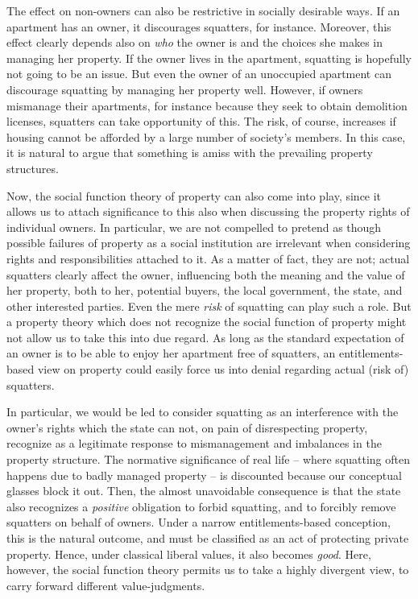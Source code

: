 The effect on non-owners can also be restrictive in socially desirable ways. If an apartment has an owner, it discourages squatters, for instance. Moreover, this effect clearly depends also on {\it who} the owner is and the choices she makes in managing her property. If the owner lives in the apartment, squatting is hopefully not going to be an issue. But even the owner of an unoccupied apartment can discourage squatting by managing her property well. However, if owners mismanage their apartments, for instance because they seek to obtain demolition licenses, squatters can take opportunity of this. The risk, of course, increases if housing cannot be afforded by a large number of society's members. In this case, it is natural to argue that something is amiss with the prevailing property structures.

Now, the social function theory of property can also come into play, since it allows us to attach significance to this also when discussing the property rights of individual owners.  In particular, we are not compelled to pretend as though possible failures of property as a social institution are irrelevant when considering rights and responsibilities attached to it. As a matter of fact, they are not; actual squatters clearly affect the owner, influencing both the meaning and the value of her property, both to her, potential buyers, the local government, the state, and other interested parties. Even the mere {\it risk} of squatting can play such a role. But a property theory which does not recognize the social function of property might not allow us to take this into due regard. As long as the standard expectation of an owner is to be able to enjoy her apartment free of squatters, an entitlements-based view on property could easily force us into denial regarding actual (risk of) squatters.

In particular, we would be led to consider squatting as an interference with the owner's rights which the state can not, on pain of disrespecting property, recognize as a legitimate response to mismanagement and imbalances in the property structure. The normative significance of real life -- where squatting often happens due to badly managed property -- is discounted  because our conceptual glasses block it out. Then, the almost unavoidable consequence is that the state also recognizes a {\it positive} obligation to forbid squatting, and to forcibly remove squatters on behalf of owners. Under a narrow entitlements-based conception, this is the natural outcome, and must be classified as an act of protecting private property. Hence, under classical liberal values, it also becomes {\it good}. Here, however, the social function theory permits us to take a highly divergent view, to carry forward different value-judgments.

